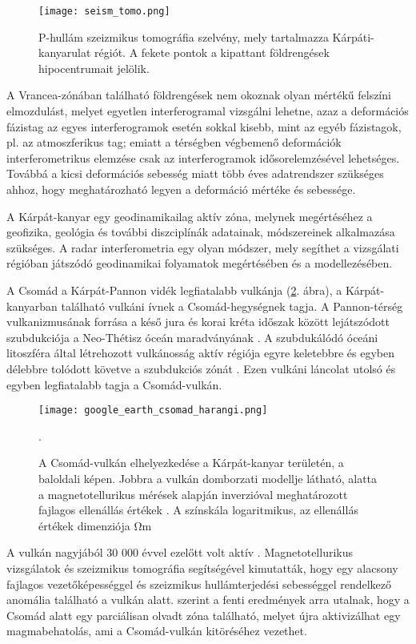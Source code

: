 \documentclass[12pt]{report}
\numberwithin{equation}{section}
\numberwithin{table}{section}
\numberwithin{figure}{section}
\begin{document}
\begin{figure}
    \centering
    \texttt{[image: seism\_tomo.png]}
    \caption{P-hullám szeizmikus tomográfia szelvény, mely tartalmazza Kárpáti-kanyarulat régiót. A fekete pontok a kipattant földrengések hipocentrumait jelölik.\cite{Matenco2012}}\label{seism_tomo}
\end{figure}

A Vrancea-zónában található földrengések nem okoznak olyan mértékű felszíni elmozdulást, melyet egyetlen interferogramal vizsgálni lehetne, azaz a deformációs fázistag az egyes interferogramok esetén sokkal kisebb, mint az egyéb fázistagok, pl. az atmoszferikus tag; emiatt a térségben végbemenő deformációk interferometrikus elemzése csak az interferogramok idősorelemzésével lehetséges. Továbbá a kicsi deformációs sebesség miatt több éves adatrendszer szükséges ahhoz, hogy meghatározható legyen a deformáció mértéke és sebessége.

A Kárpát-kanyar egy geodinamikailag aktív zóna, melynek megértéséhez a geofizika, geológia és további diszciplínák adatainak, módszereinek alkalmazása szükséges. A radar interferometria egy olyan módszer, mely segíthet a vizsgálati régióban játszódó geodinamikai folyamatok megértésében és a modellezésében.

A Csomád a Kárpát-Pannon vidék legfiatalabb vulkánja (\ref{csomad}. ábra), a Kárpát-kanyarban található vulkáni ívnek a Csomád-hegységnek tagja. A Pannon-térség vulkanizmusának forrása a késő jura és korai kréta időszak között lejátszódott szubdukciója a Neo-Thétisz óceán maradványának \cite{Matenco2012}. A szubdukálódó óceáni litoszféra által létrehozott vulkánosság aktív régiója egyre keletebbre és egyben délebbre tolódott követve a szubdukciós zónát \cite{Harangi2014}. Ezen vulkáni láncolat utolsó és egyben legfiatalabb tagja a Csomád-vulkán.

\begin{figure}[H]
    \centering
    \texttt{[image: google\_earth\_csomad\_harangi.png]}
    \caption{A Csomád-vulkán elhelyezkedése a Kárpát-kanyar területén, a baloldali képen. Jobbra a vulkán domborzati modellje látható, alatta a magnetotellurikus mérések alapján inverzióval meghatározott fajlagos ellenállás értékek \cite{Harangi2014}. A színskála logaritmikus, az ellenállás értékek dimenziója $\si{\ohm\meter}$}.\label{csomad}
\end{figure}

A vulkán nagyjából 30 000 évvel ezelőtt volt aktív \cite{Harangi2010}. Magnetotellurikus vizsgálatok \cite{Harangi2014} és szeizmikus tomográfia \cite{Popa2012} segítségével kimutatták, hogy egy alacsony fajlagos vezetőképességgel és szeizmikus hullámterjedési sebességgel rendelkező anomália található a vulkán alatt. \cite{Harangi2014} szerint a fenti eredmények arra utalnak, hogy a Csomád alatt egy parciálisan olvadt zóna található, melyet újra aktivizálhat egy magmabehatolás, ami a Csomád-vulkán kitöréséhez vezethet.
\end{document}
